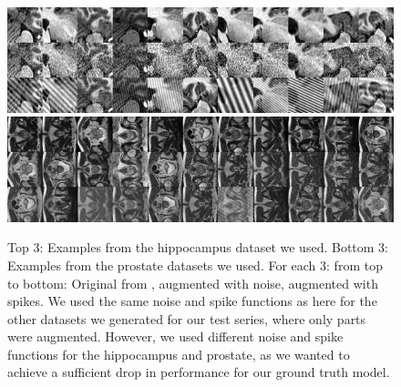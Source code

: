 \begin{figure}[h!]
    \centering
    \includegraphics[width=\linewidth]{Graphics/datasets/datasets_hippo_augmented.png}\\
    \vspace{5pt}
    \includegraphics[width=\linewidth]{Graphics/datasets/datasets_prostate_all_augmented_highRes.png}
    \caption{Top 3: Examples from the hippocampus dataset we used. Bottom 3: Examples from the prostate datasets we used. For each 3: from top to bottom: Original from \autocite{Antonelli:2022:MedSegmentationDecatlon}, augmented with noise, augmented with spikes. We used the same noise and spike functions as here for the other datasets we generated for our test series, where only parts were augmented. However, we used different noise and spike functions for the hippocampus and prostate, as we wanted to achieve a sufficient drop in performance for our ground truth model.}
    \label{fig:augemented:datasets:augemented_hippo_prostate}
\end{figure}

